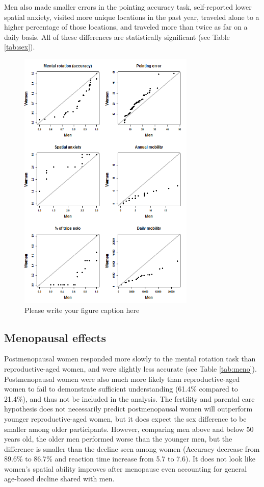 Men also made smaller errors in the pointing accuracy task, self-reported lower spatial anxiety, visited more unique locations in the past year, traveled alone to a higher percentage of those locations, and traveled more than twice as far on a daily basis.  All of these differences are statistically significant (see Table \ref{tab:sex}).

\begin{figure}[!htb]
  \includegraphics[width=0.75\textwidth]{QQ_sex}
\caption{Please write your figure caption here}
\label{fig:sex}       %
\end{figure}


	\subsection{Menopausal effects}
	\label{sec:3.2}
	
Postmenopausal women responded more slowly to the mental rotation task than reproductive-aged women, and were slightly less accurate (see Table \ref{tab:meno}).  Postmenopausal women were also much more likely than reproductive-aged women to fail to demonstrate sufficient understanding (61.4\% compared to 21.4\%), and thus not be included in the analysis.  The fertility and parental care hypothesis does not necessarily predict postmenopausal women will outperform younger reproductive-aged women, but it does expect the sex difference to be smaller among older participants.  However, comparing men above and below 50 years old, the older men performed worse than the younger men, but the difference is smaller than the decline seen among women (Accuracy decrease from 89.6\% to 86.7\% and reaction time increase from 5.7 to 7.6).  It does not look like women's spatial ability improves after menopause even accounting for general age-based decline shared with men.  

